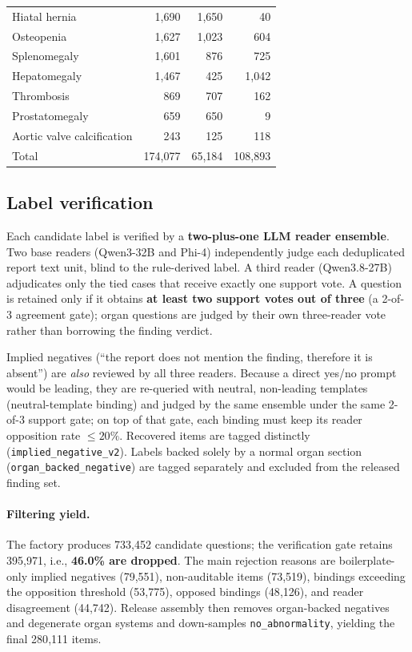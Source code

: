 \begin{table}[t]
\begin{tabular}{lrrr}
Hiatal hernia                 & 1{,}690 & 1{,}650 & 40 \\
Osteopenia                    & 1{,}627 & 1{,}023 & 604 \\
Splenomegaly                  & 1{,}601 & 876 & 725 \\
Hepatomegaly                  & 1{,}467 & 425 & 1{,}042 \\
Thrombosis                    & 869 & 707 & 162 \\
Prostatomegaly                & 659 & 650 & 9 \\
Aortic valve calcification    & 243 & 125 & 118 \\
\midrule
Total                         & 174{,}077 & 65{,}184 & 108{,}893 \\
\bottomrule
\end{tabular}
\end{table}

\subsection{Label verification}
\label{sec:verification}
Each candidate label is verified by a \textbf{two-plus-one LLM reader ensemble}.
Two base readers (Qwen3-32B and Phi-4) independently judge each deduplicated
report text unit, blind to the rule-derived label. A third reader
(Qwen3.8-27B) adjudicates only the tied cases that receive exactly one support
vote. A question is retained only if it obtains \textbf{at least two support votes
out of three} (a 2-of-3 agreement gate); organ questions are judged by their own
three-reader vote rather than borrowing the finding verdict.

Implied negatives (``the report does not mention the finding, therefore it is
absent'') are \emph{also} reviewed by all three readers. Because a direct yes/no
prompt would be leading, they are re-queried with neutral, non-leading templates
(neutral-template binding) and judged by the same ensemble under the same 2-of-3
support gate; on top of that gate, each binding must keep its reader opposition
rate $\le 20\%$. Recovered items are tagged distinctly
(\texttt{implied\_negative\_v2}). Labels backed solely by a normal organ section
(\texttt{organ\_backed\_negative}) are tagged separately and excluded from the
released finding set.

\paragraph{Filtering yield.}
The factory produces 733{,}452 candidate questions; the verification gate retains
395{,}971, i.e., \textbf{46.0\% are dropped}. The main rejection reasons are
boilerplate-only implied negatives (79{,}551), non-auditable items (73{,}519),
bindings exceeding the opposition threshold (53{,}775), opposed bindings
(48{,}126), and reader disagreement (44{,}742). Release assembly then removes
organ-backed negatives and degenerate organ systems and down-samples
\texttt{no\_abnormality}, yielding the final 280{,}111 items.

